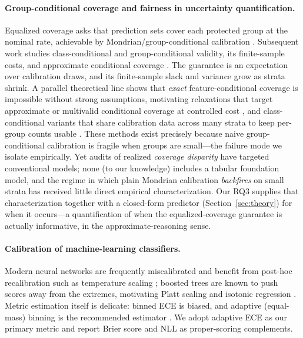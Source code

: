 \documentclass[review,12pt]{elsarticle}
\begin{document}
\paragraph{Group-conditional coverage and fairness in uncertainty quantification.}
Equalized coverage asks that prediction sets cover each protected group at the nominal rate, achievable by Mondrian/group-conditional calibration \cite{romano2020eq,vovk2003}. Subsequent work studies class-conditional and group-conditional validity, its finite-sample costs, and approximate conditional coverage \cite{ding2023,gibbs2023,jung2023}. The guarantee is an expectation over calibration draws, and its finite-sample slack and variance grow as strata shrink. A parallel theoretical line shows that \emph{exact} feature-conditional coverage is impossible without strong assumptions, motivating relaxations that target approximate or multivalid conditional coverage at controlled cost \cite{gibbs2023,jung2023}, and class-conditional variants that share calibration data across many strata to keep per-group counts usable \cite{ding2023}. These methods exist precisely because naive group-conditional calibration is fragile when groups are small---the failure mode we isolate empirically. Yet audits of realized \emph{coverage disparity} have targeted conventional models; none (to our knowledge) includes a tabular foundation model, and the regime in which plain Mondrian calibration \emph{backfires} on small strata has received little direct empirical characterization. Our RQ3 supplies that characterization together with a closed-form predictor (Section~\ref{sec:theory}) for when it occurs---a quantification of when the equalized-coverage guarantee is actually informative, in the approximate-reasoning sense.

\paragraph{Calibration of machine-learning classifiers.}
Modern neural networks are frequently miscalibrated and benefit from post-hoc recalibration such as temperature scaling \cite{guo2017}; boosted trees are known to push scores away from the extremes, motivating Platt scaling and isotonic regression \cite{niculescu2005}. Metric estimation itself is delicate: binned ECE is biased, and adaptive (equal-mass) binning is the recommended estimator \cite{nixon2019}. We adopt adaptive ECE as our primary metric and report Brier score and NLL as proper-scoring complements.
\end{document}
